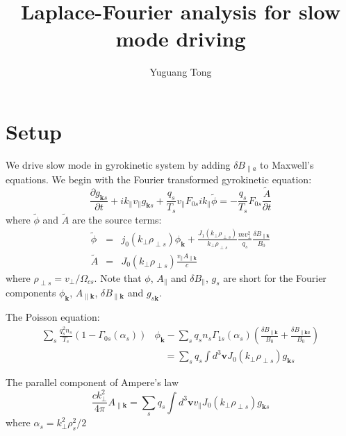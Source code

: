 \documentclass[12pt]{article}
\title{Laplace-Fourier analysis for slow mode driving}
\author{Yuguang Tong}
\begin{document}
\maketitle

\section{Setup}
We drive slow mode in gyrokinetic system by adding $\delta B_{\parallel a}$ to Maxwell's equations. We begin with the Fourier transformed gyrokinetic equation:
%
\begin{equation}
\frac{\partial g_{\mathbf{k}s}}{\partial t} + i k_\parallel v_\parallel g_{\mathbf{k}s} + \frac{q_s}{T_s} v_\parallel F_{0s} i k_\parallel\tilde{\phi} = -\frac{q_s}{T_s} F_{0s} \frac{\tilde{A}}{\partial{t}}
\label{eq:gk_eq}
\end{equation}
%
where $\tilde{\phi}$ and $\tilde{A}$ are the source terms:
%
\begin{eqnarray}
\tilde{\phi} & = & j_0(k_\perp \rho_{\perp s})\phi_\mathbf{k}
 +  \frac{J_1(k_\perp \rho_{\perp s})}{k_\perp \rho_{\perp s}}\frac{mv_\perp^2}{q_s} 
\frac{\delta B_{\parallel\mathbf{k}}}{B_0} \\
\tilde{A} & =& J_0\left( k_\perp \rho_{\perp s}\right) \frac{v_\parallel A_{\parallel\mathbf{k}}}{c}
\end{eqnarray}
%
where $\rho_{\perp s} = v_{\perp}/\Omega_{cs}$. Note that $\phi$, $A_\parallel$ and $\delta B_\parallel$, $g_s$ are short for the Fourier components $\phi_\mathbf{k}$, $A_{\parallel \mathbf{k}}$, $\delta B_{\parallel \mathbf{k}}$ and $g_{s\mathbf{k}}$.

The Poisson equation:
\begin{equation}
\begin{split}
\sum_s \frac{q_s^2 n_s}{T_s} (1 - \Gamma_{0s}(\alpha_s)) & \phi_\mathbf{k} - \sum_s q_s n_s \Gamma_{1s} (\alpha_s) \left( \frac{\delta B_{\parallel \mathbf{k}}}{B_0} + \frac{\delta B_{\parallel \mathbf{k}a}}{B_0}\right)\\
&\quad  = \sum_s q_s \int d^3 \mathbf{v} J_0(k_\perp \rho_{\perp s}) g_{\mathbf{k}s}
\end{split}
\end{equation}

The parallel component of Ampere's law
\begin{equation}
\frac{ck_\perp^2}{4\pi} A_{\parallel\mathbf{k}} = \sum_s q_s \int d^3\mathbf{v} v_\parallel J_0(k_\perp \rho_{\perp s}) g_{\mathbf{k}s}
\end{equation}
where $\alpha_s = k_\perp^2 \rho_s^2/2$ 
\end{document}
